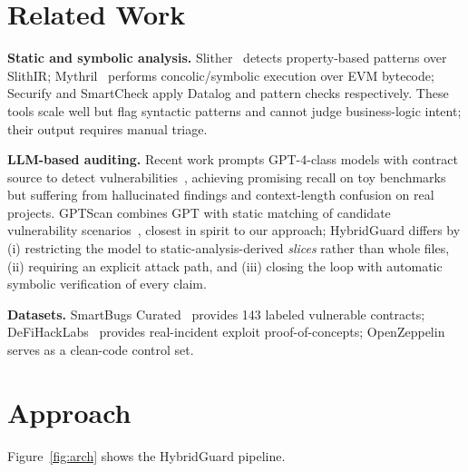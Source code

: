 \documentclass[conference]{IEEEtran}
\newcommand{\system}{HybridGuard}
\begin{document}
\section{Related Work}
\textbf{Static and symbolic analysis.} Slither~\cite{slither} detects property-based patterns
over SlithIR; Mythril~\cite{mythril} performs concolic/symbolic execution over EVM bytecode; Securify
and SmartCheck apply Datalog and pattern checks respectively. These tools scale well but flag
syntactic patterns and cannot judge business-logic intent; their output requires manual triage.

\textbf{LLM-based auditing.} Recent work prompts GPT-4-class models with contract source to detect
vulnerabilities~\cite{llm4vuln,propertygpt}, achieving promising recall on toy benchmarks but
suffering from hallucinated findings and context-length confusion on real projects. GPTScan
combines GPT with static matching of candidate vulnerability scenarios~\cite{gptscan}, closest in
spirit to our approach; \system{} differs by (i) restricting the model to static-analysis-derived
\emph{slices} rather than whole files, (ii) requiring an explicit attack path, and (iii) closing the
loop with automatic symbolic verification of every claim.

\textbf{Datasets.} SmartBugs Curated~\cite{smartbugs} provides 143 labeled vulnerable contracts;
DeFiHackLabs~\cite{defihacklabs} provides real-incident exploit proof-of-concepts;
OpenZeppelin~\cite{openzeppelin} serves as a clean-code control set.

\section{Approach}
Figure~\ref{fig:arch} shows the \system{} pipeline.
\end{document}
